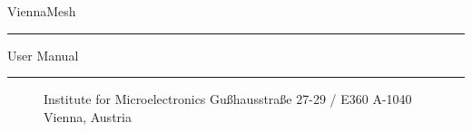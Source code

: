 
\begin{titlepage}

\vspace*{3cm}
\Huge{ViennaMesh} 
\rule[0.0cm]{10.7cm}{0.05cm}
\begin{flushright}
\Large{User Manual}
\end{flushright}

\vspace{13cm}
\rule[0.0cm]{16.0cm}{0.05cm}
\begin{figure}[!ht]
   \vspace{-1.0cm}
   \centering
   \begin{minipage}{3cm}
   \end{minipage}
   \hfill
   \hspace{-0.5cm}
   \begin{minipage}{5.5cm}
      \vspace{0.5cm}
      \begin{center}
      Institute for Microelectronics\newline
      Gu\ss hausstra\ss e 27-29 / E360\newline 
      A-1040 Vienna, Austria\newline
      \end{center}
   \end{minipage}   
   \hfill   
   \begin{minipage}{2.6cm}
   \end{minipage}
\end{figure}

\end{titlepage}





